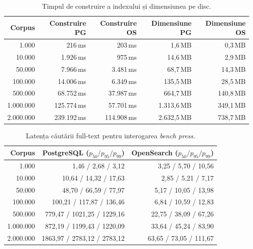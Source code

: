 \begin{table}[!htb]
  \centering
  \small
  \begin{tabular}{@{}rrrrr@{}}
  \toprule
  Corpus & Construire PG & Construire OS & Dimensiune PG & Dimensiune OS \\
  \midrule
  1.000     & 216\,ms     & 203\,ms     & 1,6\,MB     & 0,3\,MB \\
  10.000    & 1.926\,ms   & 975\,ms     & 14,6\,MB    & 2,9\,MB \\
  50.000    & 7.966\,ms   & 3.481\,ms   & 68,7\,MB    & 14,3\,MB \\
  100.000   & 14.006\,ms  & 6.349\,ms   & 135,5\,MB   & 28,5\,MB \\
  500.000   & 68.752\,ms  & 37.987\,ms  & 664,7\,MB   & 140,8\,MB \\
  1.000.000 & 125.774\,ms & 57.701\,ms  & 1.313,6\,MB & 349,1\,MB \\
  2.000.000 & 239.192\,ms & 114.908\,ms & 2.632,5\,MB & 738,7\,MB \\
  \bottomrule
  \end{tabular}
  \caption{Timpul de construire a indexului și dimensiunea pe disc.}
\end{table}

\begin{table}[!htb]
  \centering
  \small
  \begin{tabular}{@{}rrr@{}}
  \toprule
  Corpus & PostgreSQL ($p_{50}/p_{95}/p_{99}$) & OpenSearch ($p_{50}/p_{95}/p_{99}$) \\
  \midrule
  1.000     & 1,46 / 2,68 / 3,12          & 3,25 / 5,70 / 10,56 \\
  10.000    & 10,64 / 14,32 / 17,63       & 2,85 / 5,21 / 7,17 \\
  50.000    & 48,70 / 66,59 / 77,97       & 5,17 / 10,05 / 13,98 \\
  100.000   & 100,21 / 117,87 / 136,46    & 6,84 / 10,59 / 12,83 \\
  500.000   & 779,47 / 1021,25 / 1229,16  & 22,75 / 38,09 / 67,26 \\
  1.000.000 & 872,19 / 1199,43 / 1220,09  & 33,64 / 45,24 / 83,90 \\
  2.000.000 & 1863,97 / 2783,12 / 2783,12 & 63,65 / 73,05 / 111,67 \\
  \bottomrule
  \end{tabular}
  \caption{Latența căutării full-text pentru interogarea \emph{bench press}.}
\end{table}

